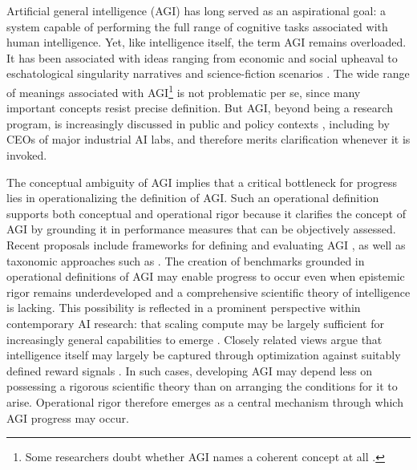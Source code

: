 \documentclass{article}
\begin{document}
Artificial general intelligence (AGI) has long served as an aspirational goal: a system capable of performing the full range of cognitive tasks associated with human intelligence.
Yet, like intelligence itself, the term AGI remains overloaded.
It has been associated with ideas ranging from economic and social upheaval \cite{korinek2024_economic_policy_challenges_age_ai} to eschatological singularity narratives \cite{kurzweil2024_singularity_is_nearer} and science-fiction scenarios \cite{CaveDihal2019Hopes}.
The wide range of meanings associated with AGI\footnote{Some researchers doubt whether AGI names a coherent concept at all \cite{Gopnik2020CritiqueAGI,InformationBottleneck2025LeCun,Amodei2025_AnthropicInterview}.} is not problematic per se, since many important concepts resist precise definition.
But AGI, beyond being a research program, is increasingly discussed in public and policy contexts \cite{AguerayArcasNorvig2023AGI,korinek2024_economic_policy_challenges_age_ai}, including by CEOs of major industrial AI labs, and therefore merits clarification whenever it is invoked.

The conceptual ambiguity of AGI implies that a critical bottleneck for progress lies in operationalizing the definition of AGI.
Such an operational definition supports both conceptual and operational rigor because it clarifies the concept of AGI by grounding it in performance measures that can be objectively assessed.
Recent proposals include frameworks for defining and evaluating AGI \cite{hendrycks2025definitionagi, burnell2026measuring}, as well as taxonomic approaches such as \cite{Morris2024LevelsAGI}.
The creation of benchmarks grounded in operational definitions of AGI may enable progress to occur even when epistemic rigor remains underdeveloped and a comprehensive scientific theory of intelligence is lacking.
This possibility is reflected in a prominent perspective within contemporary AI research: that scaling compute may be largely sufficient for increasingly general capabilities to emerge \cite{altman2025_three_observations}.
Closely related views argue that intelligence itself may largely be captured through optimization against suitably defined reward signals \cite{silver2021reward}.
In such cases, developing AGI may depend less on possessing a rigorous scientific theory than on arranging the conditions for it to arise.
Operational rigor therefore emerges as a central mechanism through which AGI progress may occur.
\end{document}
